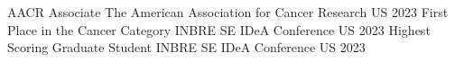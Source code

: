 

\begin{cvhonors}

\cvhonor
   {AACR Associate} %
   {\hfill
   The American Association for Cancer Research
   \hspace{3em}} %
   {US} %
   {2023} %
\cvhonor
    {First Place in the Cancer Category} %
    {\hfill
    INBRE SE IDeA Conference
    \hspace{3em}} %
    {US} %
    {2023} %
\cvhonor
    {Highest Scoring Graduate Student} %
    {\hfill
    INBRE SE IDeA Conference
    \hspace{3em}} %
    {US} %
    {2023} %
    
\end{cvhonors}



